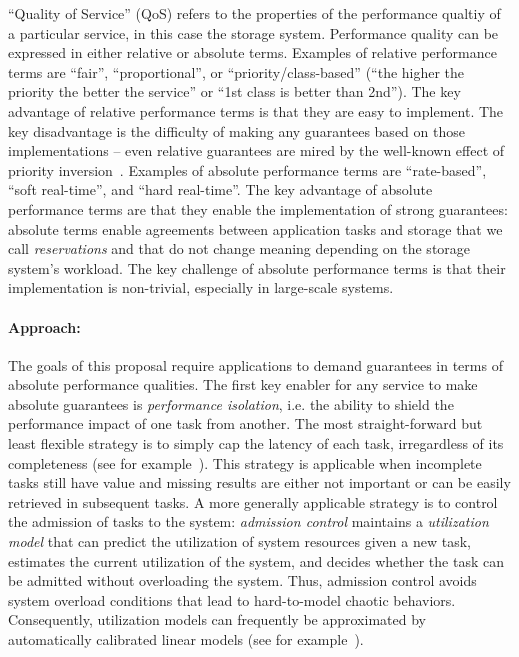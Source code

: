 ``Quality of Service'' (QoS) refers to the
properties of the performance qualtiy of a particular service, in this case the storage system.
Performance quality can be expressed in either relative or absolute
terms. Examples of relative performance terms are ``fair'',
``proportional'', or ``priority/class-based'' (``the higher the
priority the better the service'' or ``1st class is better than
2nd''). The key advantage of relative performance terms is that
they are easy to implement. The key disadvantage is the difficulty
of making any guarantees based on those implementations --
even relative guarantees are mired by the well-known effect of
priority inversion~\cite{lampson:cacm80}. Examples of absolute
performance terms are ``rate-based'', ``soft real-time'', and
``hard real-time''. The key advantage of absolute performance
terms are that they enable the implementation of strong
guarantees: absolute terms enable agreements between application tasks and storage that we call \emph{reservations} and that do not change meaning depending
on the storage system's workload. The key challenge of absolute
performance terms is that their implementation is non-trivial,
especially in large-scale systems.

\paragraph{Approach:} The goals of this proposal require applications
to demand guarantees in terms of absolute performance qualities.
The first key enabler for any service to make absolute guarantees
is \emph{performance isolation}, i.e. the ability to shield the
performance impact of one task from another. The most straight-forward
but least flexible strategy is to simply cap the latency of each
task, irregardless of its completeness (see for
example~\cite{decandia:sosp07}). This strategy is applicable when
incomplete tasks still have value and missing results are either
not important or can be easily retrieved in subsequent tasks. A
more generally applicable strategy is to control the admission of
tasks to the system: \emph{admission control} maintains a
\emph{utilization model} that can predict the utilization of system
resources given a new task, estimates the current utilization of
the system, and decides whether the task can be admitted without
overloading the system. Thus, admission control avoids system
overload conditions that lead to hard-to-model chaotic behaviors.
Consequently, utilization models can frequently be approximated by
automatically calibrated linear models (see for
example~\cite{skourtis:hpdc12}).

